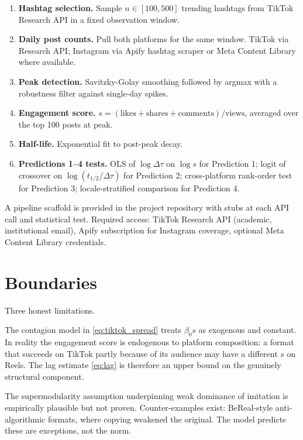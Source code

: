 \documentclass[12pt,a4paper]{article}
\begin{document}
\begin{enumerate}[leftmargin=2em, itemsep=0.3em]
  \item \textbf{Hashtag selection.} Sample $n \in [100, 500]$ trending hashtags from TikTok Research API in a fixed observation window.
  \item \textbf{Daily post counts.} Pull both platforms for the same window. TikTok via Research API; Instagram via Apify hashtag scraper or Meta Content Library where available.
  \item \textbf{Peak detection.} Savitzky-Golay smoothing followed by argmax with a robustness filter against single-day spikes.
  \item \textbf{Engagement score.} $s = (\text{likes} + \text{shares} + \text{comments}) / \text{views}$, averaged over the top 100 posts at peak.
  \item \textbf{Half-life.} Exponential fit to post-peak decay.
  \item \textbf{Predictions 1--4 tests.} OLS of $\log \Delta\tau$ on $\log s$ for Prediction 1; logit of crossover on $\log(t_{1/2}/\Delta\tau)$ for Prediction 2; cross-platform rank-order test for Prediction 3; locale-stratified comparison for Prediction 4.
\end{enumerate}

A pipeline scaffold is provided in the project repository with stubs at each API call and statistical test. Required access: TikTok Research API (academic, institutional email), Apify subscription for Instagram coverage, optional Meta Content Library credentials.

\section{Boundaries}
\label{sec:boundaries}

Three honest limitations.

The contagion model in \eqref{eq:tiktok_spread} treats $\beta_0 s$ as exogenous and constant. In reality the engagement score is endogenous to platform composition: a format that succeeds on TikTok partly because of its audience may have a different $s$ on Reels. The lag estimate \eqref{eq:lag} is therefore an upper bound on the genuinely structural component.

The supermodularity assumption underpinning weak dominance of imitation is empirically plausible but not proven. Counter-examples exist: BeReal-style anti-algorithmic formats, where copying weakened the original. The model predicts these are exceptions, not the norm.
\end{document}
